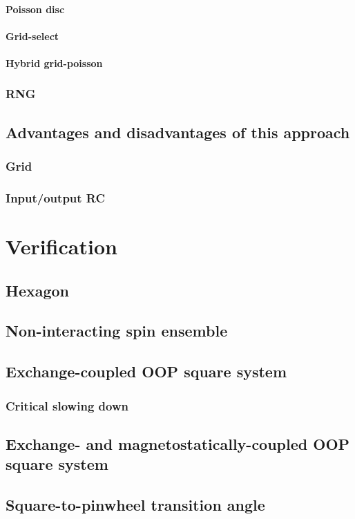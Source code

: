 \paragraph{Poisson disc}
\paragraph{Grid-select}
\paragraph{Hybrid grid-poisson}
\subsubsection{RNG} %
\subsection{Advantages and disadvantages of this approach} %
\subsubsection{Grid}
\subsubsection{Input/output RC}

\section{Verification} %
\subsection{Hexagon}
\subsection{Non-interacting spin ensemble}
\subsection{Exchange-coupled OOP square system}
\subsubsection{Critical slowing down}
\subsection{Exchange- and magnetostatically-coupled OOP square system}
\subsection{Square-to-pinwheel transition angle}
